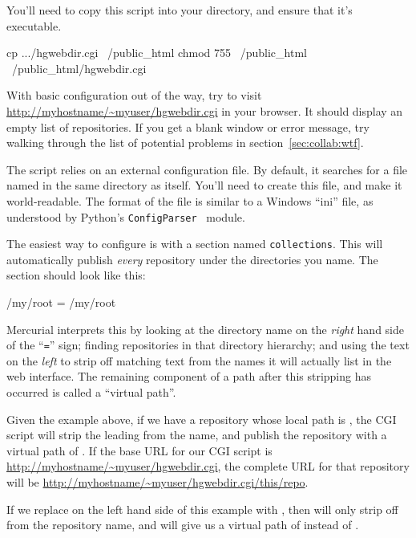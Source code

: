 You'll need to copy this script into your 
directory, and ensure that it's executable.
\begin{codesample2}
  cp .../hgwebdir.cgi ~/public_html
  chmod 755 ~/public_html ~/public_html/hgwebdir.cgi
\end{codesample2}
With basic configuration out of the way, try to visit
\url{http://myhostname/~myuser/hgwebdir.cgi} in your browser.  It
should display an empty list of repositories.  If you get a blank
window or error message, try walking through the list of potential
problems in section~\ref{sec:collab:wtf}.

The  script relies on an external
configuration file.  By default, it searches for a file named
 in the same directory as itself.  You'll need
to create this file, and make it world-readable.  The format of the
file is similar to a Windows ``ini'' file, as understood by Python's
\texttt{ConfigParser}~\cite{web:configparser} module.

The easiest way to configure  is with a
section named \texttt{collections}.  This will automatically publish
\emph{every} repository under the directories you name.  The section
should look like this:
\begin{codesample2}
  [collections]
  /my/root = /my/root
\end{codesample2}
Mercurial interprets this by looking at the directory name on the
\emph{right} hand side of the ``\texttt{=}'' sign; finding
repositories in that directory hierarchy; and using the text on the
\emph{left} to strip off matching text from the names it will actually
list in the web interface.  The remaining component of a path after
this stripping has occurred is called a ``virtual path''.

Given the example above, if we have a repository whose local path is
, the CGI script will strip the leading
 from the name, and publish the repository with a
virtual path of .  If the base URL for our CGI
script is \url{http://myhostname/~myuser/hgwebdir.cgi}, the complete
URL for that repository will be
\url{http://myhostname/~myuser/hgwebdir.cgi/this/repo}.

If we replace  on the left hand side of this example
with , then  will only strip off
 from the repository name, and will give us a virtual
path of  instead of .

